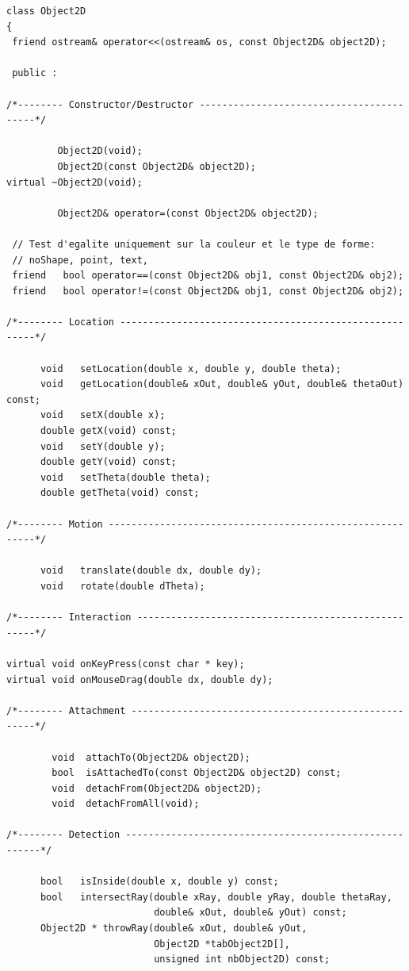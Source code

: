 \documentclass[12pt]{article}
\begin{document}
\begin{small}
\begin{verbatim}
class Object2D
{
 friend ostream& operator<<(ostream& os, const Object2D& object2D);

 public :

/*-------- Constructor/Destructor -----------------------------------------*/

         Object2D(void);
         Object2D(const Object2D& object2D);
virtual ~Object2D(void);

         Object2D& operator=(const Object2D& object2D);

 // Test d'egalite uniquement sur la couleur et le type de forme:
 // noShape, point, text, 
 friend   bool operator==(const Object2D& obj1, const Object2D& obj2);
 friend   bool operator!=(const Object2D& obj1, const Object2D& obj2);

/*-------- Location -------------------------------------------------------*/

      void   setLocation(double x, double y, double theta);
      void   getLocation(double& xOut, double& yOut, double& thetaOut) const;
      void   setX(double x);
      double getX(void) const;
      void   setY(double y);
      double getY(void) const;
      void   setTheta(double theta);
      double getTheta(void) const;

/*-------- Motion ---------------------------------------------------------*/

      void   translate(double dx, double dy);
      void   rotate(double dTheta);

/*-------- Interaction ----------------------------------------------------*/

virtual void onKeyPress(const char * key);
virtual void onMouseDrag(double dx, double dy);

/*-------- Attachment -----------------------------------------------------*/

        void  attachTo(Object2D& object2D);
        bool  isAttachedTo(const Object2D& object2D) const;
        void  detachFrom(Object2D& object2D);
        void  detachFromAll(void);

/*-------- Detection -------------------------------------------------------*/

      bool   isInside(double x, double y) const;
      bool   intersectRay(double xRay, double yRay, double thetaRay,
                          double& xOut, double& yOut) const;
      Object2D * throwRay(double& xOut, double& yOut,
                          Object2D *tabObject2D[],
                          unsigned int nbObject2D) const;


\end{verbatim}
\end{small}
\end{document}
